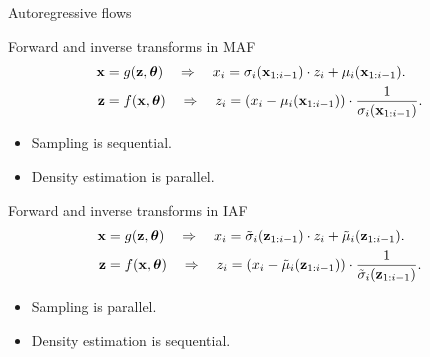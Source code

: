 \begin{frame}{Autoregressive flows}
	\begin{block}{Forward and inverse transforms in MAF}
		\vspace{-0.6cm}
		\begin{align*}
			\mathbf{x} &= g(\mathbf{z}, \boldsymbol{\theta}) \quad \Rightarrow \quad x_i = \sigma_i (\mathbf{x}_{1:i-1}) \cdot z_i + \mu_i(\mathbf{x}_{1:i-1}). \\
			\mathbf{z} &= f(\mathbf{x}, \boldsymbol{\theta}) \quad \Rightarrow \quad z_i = \left(x_i - \mu_i(\mathbf{x}_{1:i-1}) \right) \cdot \frac{1}{\sigma_i (\mathbf{x}_{1:i-1}) }.
		\end{align*}
		\vspace{-0.6cm}
		\begin{itemize}
			\item Sampling is sequential.
			\item Density estimation is parallel.
		\end{itemize}
	\end{block}
	\begin{block}{Forward and inverse transforms in IAF}
		\vspace{-0.6cm}
		\begin{align*}
			\mathbf{x} &= g(\mathbf{z}, \boldsymbol{\theta}) \quad \Rightarrow \quad x_i = \tilde{\sigma}_i (\mathbf{z}_{1:i-1}) \cdot z_i + \tilde{\mu}_i(\mathbf{z}_{1:i-1}). \\
			\mathbf{z} &= f(\mathbf{x}, \boldsymbol{\theta}) \quad \Rightarrow \quad z_i = \left(x_i - \tilde{\mu}_i(\mathbf{z}_{1:i-1}) \right) \cdot \frac{1}{\tilde{\sigma}_i (\mathbf{z}_{1:i-1})}.
		\end{align*}
		\vspace{-0.6cm}
		\begin{itemize}
			\item Sampling is parallel.
			\item Density estimation is sequential.
		\end{itemize}
	\end{block}
\end{frame}
